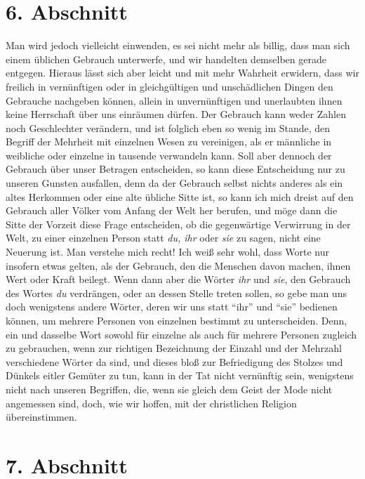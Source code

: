 \section{6. Abschnitt} \label{kap10_ab6}

Man wird jedoch vielleicht einwenden, es sei
nicht mehr als billig, dass man sich
einem üblichen Gebrauch unterwerfe, und wir handelten demselben gerade
entgegen. Hieraus lässt sich aber leicht und mit mehr Wahrheit erwidern, dass
wir freilich in vernünftigen oder in gleichgültigen und unschädlichen Dingen den
Gebrauche nachgeben können, allein in unvernünftigen und unerlaubten ihnen keine
Herrschaft über uns einräumen dürfen. Der Gebrauch kann weder Zahlen noch
Geschlechter verändern, und ist folglich eben so wenig im Stande, den Begriff
der Mehrheit mit einzelnen Wesen zu vereinigen, als er männliche in weibliche
oder einzelne in tausende verwandeln kann. Soll aber dennoch der Gebrauch über
unser Betragen entscheiden, so kann diese Entscheidung nur zu unseren Gunsten
ausfallen, denn da der Gebrauch selbst nichts anderes als ein altes Herkommen
oder eine alte übliche Sitte ist, so kann ich mich dreist auf den Gebrauch aller
Völker vom Anfang der Welt her berufen, und möge dann die Sitte der Vorzeit
diese Frage entscheiden, ob die gegenwärtige Verwirrung in der Welt, zu einer
einzelnen Person statt \textit{du, ihr} oder \textit{sie} zu sagen, nicht eine
Neuerung
ist.  Man verstehe mich recht! Ich weiß sehr wohl,
dass Worte nur insofern etwas
gelten, als der Gebrauch, den die Menschen davon machen, ihnen Wert oder Kraft
beilegt. Wenn dann aber die Wörter \textit{ihr} und \textit{sie}, den Gebrauch
des Wortes
\textit{du} verdrängen, oder an dessen Stelle treten sollen, so gebe man uns
doch
wenigstens andere Wörter, deren wir uns statt "`ihr"' und "`sie"' bedienen
können, um
mehrere Personen von einzelnen bestimmt zu unterscheiden. Denn, ein und dasselbe
Wort sowohl für einzelne als auch für mehrere Personen zugleich zu gebrauchen,
wenn zur richtigen Bezeichnung der Einzahl und der Mehrzahl verschiedene Wörter
da sind, und dieses bloß zur Befriedigung des Stolzes und Dünkels eitler
Gemüter zu tun, kann in der Tat nicht vernünftig sein, wenigstens nicht nach
unseren Begriffen, die, wenn sie gleich dem Geist der Mode nicht angemessen
sind, doch, wie wir hoffen, mit der christlichen Religion übereinstimmen.

\section{7. Abschnitt} \label{kap10_ab7}

